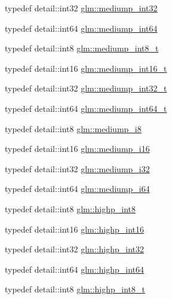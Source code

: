\begin{DoxyCompactItemize}
\item 
typedef detail\+::int32 \hyperlink{group__gtc__type__precision_ga0660a752402702f420f13c686a7fff29}{glm\+::mediump\+\_\+int32}
\item 
typedef detail\+::int64 \hyperlink{group__gtc__type__precision_ga603c695fe5cd677d3f72a81343e19a74}{glm\+::mediump\+\_\+int64}
\item 
typedef detail\+::int8 \hyperlink{group__gtc__type__precision_ga626ac5f73d3538e62a879d6c56abfb36}{glm\+::mediump\+\_\+int8\+\_\+t}
\item 
typedef detail\+::int16 \hyperlink{group__gtc__type__precision_ga478fab608cf43040013d719a3e03b194}{glm\+::mediump\+\_\+int16\+\_\+t}
\item 
typedef detail\+::int32 \hyperlink{group__gtc__type__precision_gafd9b4bd9e4465aec63351b59100692c4}{glm\+::mediump\+\_\+int32\+\_\+t}
\item 
typedef detail\+::int64 \hyperlink{group__gtc__type__precision_ga555a2f85641550c232db473a9bb981f7}{glm\+::mediump\+\_\+int64\+\_\+t}
\item 
typedef detail\+::int8 \hyperlink{group__gtc__type__precision_ga28a8b5fd51072680bb55178c17cc7411}{glm\+::mediump\+\_\+i8}
\item 
typedef detail\+::int16 \hyperlink{group__gtc__type__precision_ga8454fc6a82c7bb787d0ac9663e08f63d}{glm\+::mediump\+\_\+i16}
\item 
typedef detail\+::int32 \hyperlink{group__gtc__type__precision_ga5e00ec824eb55968a6b6496f294d8c07}{glm\+::mediump\+\_\+i32}
\item 
typedef detail\+::int64 \hyperlink{group__gtc__type__precision_ga90fedf6c701ffbe00535156715e50787}{glm\+::mediump\+\_\+i64}
\item 
typedef detail\+::int8 \hyperlink{group__gtc__type__precision_ga57c86999e666760c304453f9bfdc09d1}{glm\+::highp\+\_\+int8}
\item 
typedef detail\+::int16 \hyperlink{group__gtc__type__precision_gaf0430ed80e88c0d1dfbe47f359659c81}{glm\+::highp\+\_\+int16}
\item 
typedef detail\+::int32 \hyperlink{group__gtc__type__precision_gaa2045c92b9553d463191af6a20e997bb}{glm\+::highp\+\_\+int32}
\item 
typedef detail\+::int64 \hyperlink{group__gtc__type__precision_ga7ffb27943e9569800979081bc548621c}{glm\+::highp\+\_\+int64}
\item 
typedef detail\+::int8 \hyperlink{group__gtc__type__precision_ga417701b99e6e7992f35ab2ef694f88b2}{glm\+::highp\+\_\+int8\+\_\+t}

\end{DoxyCompactItemize}
